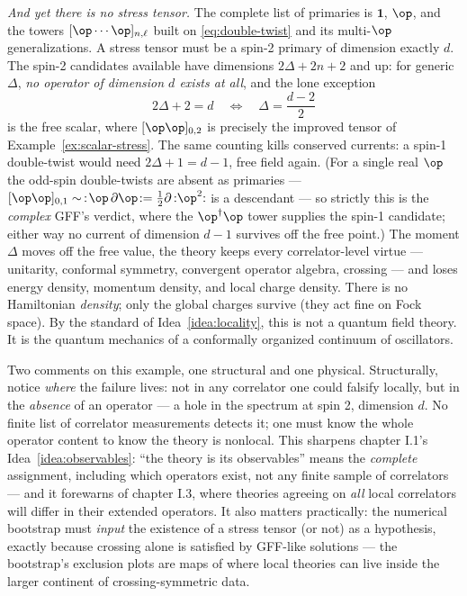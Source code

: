 \begin{eexample}
\emph{And yet there is no stress tensor.} The complete list of primaries is
$\mathbf 1$, $\op$, and the towers $[\op\cdots\op]_{n,\ell}$ built on
\eqref{eq:double-twist} and its multi-$\op$ generalizations. A stress tensor
must be a spin-2 primary of dimension exactly $d$. The spin-2 candidates
available have dimensions $2\Delta + 2n + 2$ and up: for generic $\Delta$,
\emph{no operator of dimension $d$ exists at all}, and the lone exception
\begin{equation}
2\Delta + 2 = d
\quad\Longleftrightarrow\quad
\Delta = \frac{d-2}{2}
\end{equation}
is the free scalar, where $[\op\op]_{0,2}$ is precisely the improved tensor
of Example~\ref{ex:scalar-stress}. The same counting kills conserved
currents: a spin-1 double-twist would need $2\Delta + 1 = d - 1$, free field
again. (For a single real $\op$ the odd-spin double-twists are absent as
primaries --- $[\op\op]_{0,1} \sim\, :\!\op\,\partial\op\!: =
\tfrac12\partial\,{:}\op^2{:}$ is a descendant --- so strictly this is the
\emph{complex} GFF's verdict, where the $\op^\dagger\op$ tower supplies the
spin-1 candidate; either way no current of dimension $d-1$ survives off the
free point.) The moment $\Delta$ moves off the free value, the theory keeps every
correlator-level virtue --- unitarity, conformal symmetry, convergent
operator algebra, crossing --- and loses energy density, momentum density,
and local charge density. There is no Hamiltonian \emph{density}; only the
global charges survive (they act fine on Fock space). By the standard of
Idea~\ref{idea:locality}, this is not a quantum field theory. It is the
quantum mechanics of a conformally organized continuum of oscillators.
\end{eexample}

Two comments on this example, one structural and one physical. Structurally,
notice \emph{where} the failure lives: not in any correlator one could
falsify locally, but in the \emph{absence} of an operator --- a hole in the
spectrum at spin 2, dimension $d$. No finite list of correlator measurements
detects it; one must know the whole operator content to know the theory is
nonlocal. This sharpens chapter I.1's Idea~\ref{idea:observables}: ``the
theory is its observables'' means the \emph{complete} assignment, including
which operators exist, not any finite sample of correlators --- and it
forewarns of chapter I.3, where theories agreeing on \emph{all} local
correlators will differ in their extended operators. It also matters
practically: the numerical bootstrap must \emph{input} the existence of a
stress tensor (or not) as a hypothesis, exactly because crossing alone is
satisfied by GFF-like solutions --- the bootstrap's exclusion plots are
maps of where local theories can live inside the larger continent of
crossing-symmetric data.

